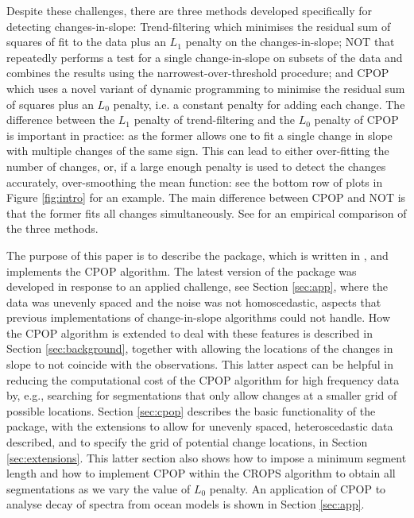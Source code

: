 \documentclass[nojss]{jss}
\begin{document}
Despite these challenges, there are three methods developed specifically for detecting changes-in-slope: Trend-filtering \citep{kim2009ell_1,tibshirani2014adaptive} which minimises the residual sum of squares of fit to the data plus an $L_1$ penalty on the changes-in-slope; NOT \citep{baranowski2016narrowest} that repeatedly performs a test for a single change-in-slope on subsets of the data and combines the results using the narrowest-over-threshold procedure; and CPOP \citep{fearnhead2019detecting} which uses a novel variant of dynamic programming to minimise the residual sum of squares plus an $L_0$ penalty, i.e. a constant penalty for adding each change. The difference between the $L_1$ penalty of trend-filtering and the $L_0$ penalty of CPOP is important in practice: as the former allows one to fit a single change in slope with multiple changes of the same sign. This can lead to either over-fitting the number of changes, or, if a large enough penalty is used to detect the changes accurately, over-smoothing the mean function: see the bottom row of plots in Figure \ref{fig:intro} for an example. The main difference between CPOP and NOT is that the former fits all changes simultaneously. See \cite{fearnhead2019detecting} for an empirical comparison of the three methods.

The purpose of this paper is to describe the  package, which is written in , and implements the CPOP algorithm. The latest version of the package was developed in response to an applied challenge, see Section \ref{sec:app}, where the data was unevenly spaced and the noise was not homoscedastic, aspects that previous implementations of change-in-slope algorithms could not handle. How the CPOP algorithm is extended to deal with these features is described in Section \ref{sec:background}, together with allowing the locations of the changes in slope to not coincide with the observations. This latter aspect can be helpful in reducing the computational cost of the CPOP algorithm for high frequency data by, e.g., searching for segmentations that only allow changes at a smaller grid of possible locations. Section \ref{sec:cpop} describes the basic functionality of the package, with the extensions to allow for unevenly spaced, heteroscedastic data described, and to specify the grid of potential change locations, in Section \ref{sec:extensions}. This latter section also shows how to impose a minimum segment length and how to implement CPOP within the CROPS algorithm \citep{haynes2017computationally} to obtain all segmentations as we vary the value of $L_0$ penalty. An application of CPOP to analyse decay of spectra from ocean models is shown in Section \ref{sec:app}.
\end{document}

